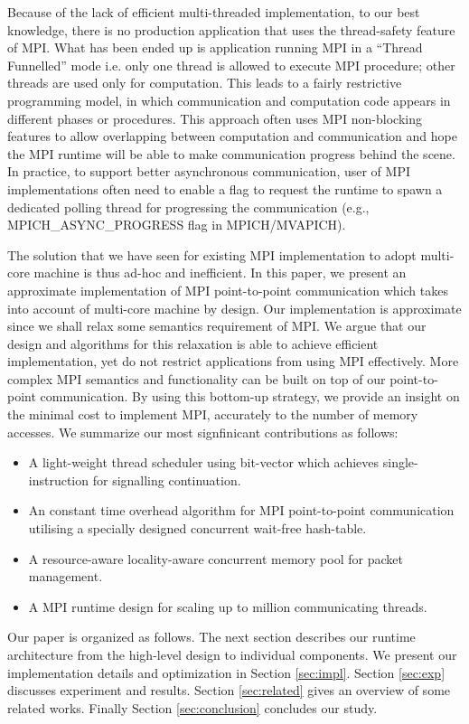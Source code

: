 Because of the lack of efficient multi-threaded implementation, to our best
knowledge, there is no production application that uses the thread-safety
feature of MPI. What has been ended up is application running MPI in a ``Thread
Funnelled'' mode i.e. only one thread is allowed to execute MPI procedure;
other threads are used only for computation. This leads to a fairly restrictive
programming model, in which communication and computation code appears in
different phases or procedures. This approach often uses MPI non-blocking
features to allow overlapping between computation and communication and hope
the MPI runtime will be able to make communication progress behind the scene.
In practice, to support better asynchronous communication, user of MPI
implementations often need to enable a flag to request the runtime to spawn a
dedicated polling thread for progressing the communication (e.g.,
MPICH_ASYNC_PROGRESS flag in MPICH/MVAPICH).

The solution that we have seen for existing MPI implementation to adopt
multi-core machine is thus ad-hoc and inefficient. In this paper, we present an
approximate implementation of MPI point-to-point communication which takes into
account of multi-core machine by design. Our implementation is approximate
since we shall relax some semantics requirement of MPI. We argue that our
design and algorithms for this relaxation is able to achieve efficient
implementation, yet do not restrict applications from using MPI effectively.
More complex MPI semantics and functionality can be built on top of our
point-to-point communication. By using this bottom-up strategy, we provide an
insight on the minimal cost to implement MPI, accurately to the number of
memory accesses. We summarize our most signfinicant contributions as follows:
\begin{itemize}
  \item A light-weight thread scheduler using bit-vector which achieves
single-instruction for signalling continuation. 
  \item An constant time overhead algorithm for MPI point-to-point communication
utilising a specially designed concurrent wait-free hash-table.
  \item A resource-aware locality-aware concurrent memory pool for packet management.
  \item A MPI runtime design for scaling up to million communicating threads.
\end{itemize}

Our paper is organized as follows. The next section describes our runtime
architecture from the high-level design to individual components. We present
our implementation details and optimization in Section \ref{sec:impl}. Section
\ref{sec:exp} discusses experiment and results. Section \ref{sec:related} gives
an overview of some related works. Finally Section \ref{sec:conclusion} concludes
our study.
